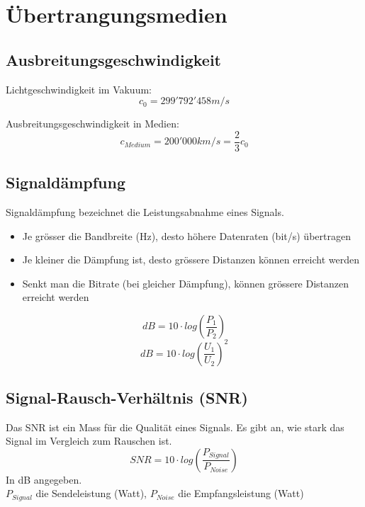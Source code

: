 
\section{Übertrangungsmedien}
\subsection{Ausbreitungsgeschwindigkeit}
{Lichtgeschwindigkeit im Vakuum:
    $$ c_0 = 299'792'458 m/s $$
}

{Ausbreitungsgeschwindigkeit in Medien: \\
    $$ c_{Medium} = 200'000 km/s = \frac{2}{3} c_0 $$}

\subsection{Signaldämpfung}{
    {Signaldämpfung bezeichnet die Leistungsabnahme eines Signals.}
    \begin{itemize}[noitemsep]
        \item Je grösser die Bandbreite (Hz), desto höhere Datenraten (bit/s) übertragen
        \item Je kleiner die Dämpfung ist, desto grössere Distanzen können erreicht werden
        \item Senkt man die Bitrate (bei gleicher Dämpfung), können grössere Distanzen erreicht werden
    \end{itemize}}
$$ dB = 10 \cdot log(\frac{P_1}{P_2})$$
$$ dB = 10 \cdot log(\frac{U_1}{U_2})^2$$

\subsection{Signal-Rausch-Verhältnis (SNR)}{
    {Das SNR ist ein Mass für die Qualität eines Signals. Es gibt an, wie stark das Signal im Vergleich zum Rauschen ist. }
    $$ SNR = 10 \cdot log(\frac{P_{Signal}}{P_{Noise}}) $$
    In dB  angegeben.\\
    $P_{Signal}$ die Sendeleistung (Watt),
    $P_{Noise}$ die Empfangsleistung (Watt)
}

